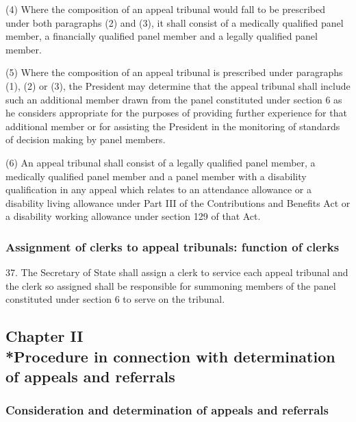 \documentclass[12pt,a4paper]{article}
\begin{document}
(4) Where the composition of an appeal tribunal would fall to be prescribed under both paragraphs (2) and (3), it shall consist of a medically qualified panel member, a financially qualified panel member and a legally qualified panel member.

(5) Where the composition of an appeal tribunal is prescribed under paragraphs (1), (2) or (3), the President may determine that the appeal tribunal shall include such an additional member drawn from the panel constituted under section 6 as he considers appropriate for the purposes of providing further experience for that additional member or for assisting the President in the monitoring of standards of decision making by panel members.

(6) An appeal tribunal shall consist of a legally qualified panel member, a medically qualified panel member and a panel member with a disability qualification in any appeal which relates to an attendance allowance or a disability living allowance under Part III of the Contributions and Benefits Act or a disability working allowance under section 129 of that Act.

\subsubsection[37. Assignment of clerks to appeal tribunals: function of clerks]{Assignment of clerks to appeal tribunals: function of clerks}

37.  The Secretary of State shall assign a clerk to service each appeal tribunal and the clerk so assigned shall be responsible for summoning members of the panel constituted under section 6 to serve on the tribunal.

\subsection[Chapter II --- Procedure in connection with determination of appeals and referrals]{Chapter II\\*Procedure in connection with determination of appeals and referrals}

\renewcommand\parthead{--- Part V Chapter II}

\subsubsection[38. Consideration and determination of appeals and referrals]{Consideration and determination of appeals and referrals}
\end{document}
